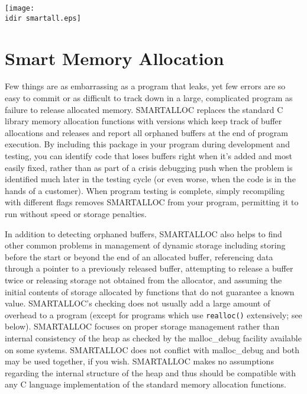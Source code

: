 
\texttt{[image: \\idir smartall.eps]} 

\chapter{Smart Memory Allocation}
\label{_ChapterStart4}

Few things are as embarrassing as a program that leaks, yet few errors are so
easy to commit or as difficult to track down in a large, complicated program
as failure to release allocated memory. SMARTALLOC replaces the standard C
library memory allocation functions with versions which keep track of buffer
allocations and releases and report all orphaned buffers at the end of program
execution. By including this package in your program during development and
testing, you can identify code that loses buffers right when it's added and
most easily fixed, rather than as part of a crisis debugging push when the
problem is identified much later in the testing cycle (or even worse, when the
code is in the hands of a customer). When program testing is complete, simply
recompiling with different flags removes SMARTALLOC from your program,
permitting it to run without speed or storage penalties. 

In addition to detecting orphaned buffers, SMARTALLOC also helps to find other
common problems in management of dynamic storage including storing before the
start or beyond the end of an allocated buffer, referencing data through a
pointer to a previously released buffer, attempting to release a buffer twice
or releasing storage not obtained from the allocator, and assuming the initial
contents of storage allocated by functions that do not guarantee a known
value. SMARTALLOC's checking does not usually add a large amount of overhead
to a program (except for programs which use {\tt realloc()} extensively; see
below). SMARTALLOC focuses on proper storage management rather than internal
consistency of the heap as checked by the malloc\_debug facility available on
some systems. SMARTALLOC does not conflict with malloc\_debug and both may be
used together, if you wish. SMARTALLOC makes no assumptions regarding the
internal structure of the heap and thus should be compatible with any C
language implementation of the standard memory allocation functions. 

